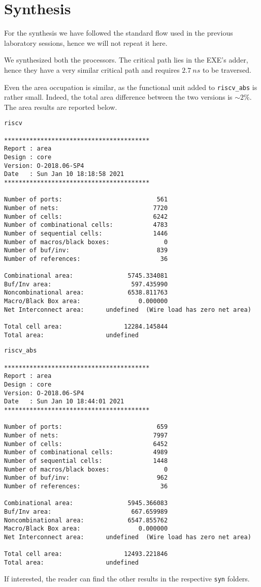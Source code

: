 \chapter{Synthesis}

For the synthesis we have followed the standard flow used in the previous laboratory sessions, hence we will
not repeat it here.

We synthesized both the processors. The critical path lies in the EXE's adder, hence they have a very similar critical
path and requires $2.7\ ns$ to be traversed.

Even the area occupation is similar, as the functional unit added to \verb|riscv_abs| is rather small. Indeed, the total
area difference between the two versions is $\sim 2\%$.
The area results are reported below.

\begin{Verbatim}
riscv

****************************************
Report : area
Design : core
Version: O-2018.06-SP4
Date   : Sun Jan 10 18:18:58 2021
****************************************

Number of ports:                          561
Number of nets:                          7720
Number of cells:                         6242
Number of combinational cells:           4783
Number of sequential cells:              1446
Number of macros/black boxes:               0
Number of buf/inv:                        839
Number of references:                      36

Combinational area:               5745.334081
Buf/Inv area:                      597.435990
Noncombinational area:            6538.811763
Macro/Black Box area:                0.000000
Net Interconnect area:      undefined  (Wire load has zero net area)

Total cell area:                 12284.145844
Total area:                 undefined
\end{Verbatim}

\bigskip

\begin{Verbatim}
riscv_abs
    
****************************************
Report : area
Design : core
Version: O-2018.06-SP4
Date   : Sun Jan 10 18:44:01 2021
****************************************

Number of ports:                          659
Number of nets:                          7997
Number of cells:                         6452
Number of combinational cells:           4989
Number of sequential cells:              1448
Number of macros/black boxes:               0
Number of buf/inv:                        962
Number of references:                      36

Combinational area:               5945.366083
Buf/Inv area:                      667.659989
Noncombinational area:            6547.855762
Macro/Black Box area:                0.000000
Net Interconnect area:      undefined  (Wire load has zero net area)

Total cell area:                 12493.221846
Total area:                 undefined
\end{Verbatim}

If interested, the reader can find the other results in the respective \verb|syn| folders.